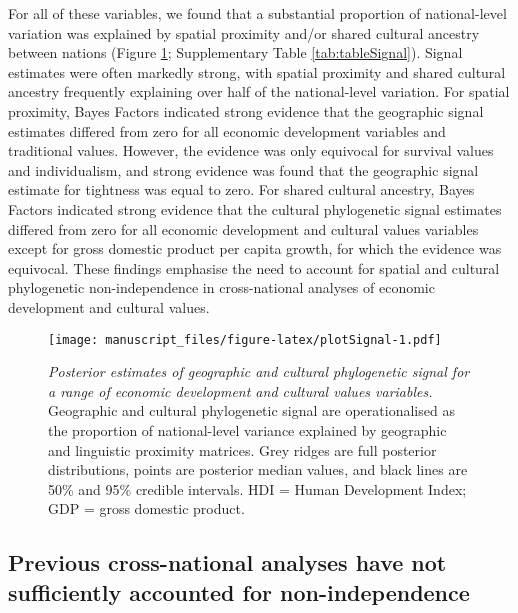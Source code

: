\documentclass[
  man,floatsintext]{apa6}
\begin{document}
For all of these variables, we found that a substantial proportion of national-level variation was explained by spatial proximity and/or shared cultural ancestry between nations (Figure \ref{fig:plotSignal}; Supplementary Table \ref{tab:tableSignal}). Signal estimates were often markedly strong, with spatial proximity and shared cultural ancestry frequently explaining over half of the national-level variation. For spatial proximity, Bayes Factors indicated strong evidence that the geographic signal estimates differed from zero for all economic development variables and traditional values. However, the evidence was only equivocal for survival values and individualism, and strong evidence was found that the geographic signal estimate for tightness was equal to zero. For shared cultural ancestry, Bayes Factors indicated strong evidence that the cultural phylogenetic signal estimates differed from zero for all economic development and cultural values variables except for gross domestic product per capita growth, for which the evidence was equivocal. These findings emphasise the need to account for spatial and cultural phylogenetic non-independence in cross-national analyses of economic development and cultural values.



\begin{figure}
\centering
\texttt{[image: manuscript\_files/figure-latex/plotSignal-1.pdf]}
\caption{\label{fig:plotSignal}\emph{Posterior estimates of geographic and cultural phylogenetic signal for a range of economic development and cultural values variables.} Geographic and cultural phylogenetic signal are operationalised as the proportion of national-level variance explained by geographic and linguistic proximity matrices. Grey ridges are full posterior distributions, points are posterior median values, and black lines are 50\% and 95\% credible intervals. HDI = Human Development Index; GDP = gross domestic product.}
\end{figure}

\hypertarget{previous-cross-national-analyses-have-not-sufficiently-accounted-for-non-independence}{%
\subsection{Previous cross-national analyses have not sufficiently accounted for non-independence}\label{previous-cross-national-analyses-have-not-sufficiently-accounted-for-non-independence}}
\end{document}
